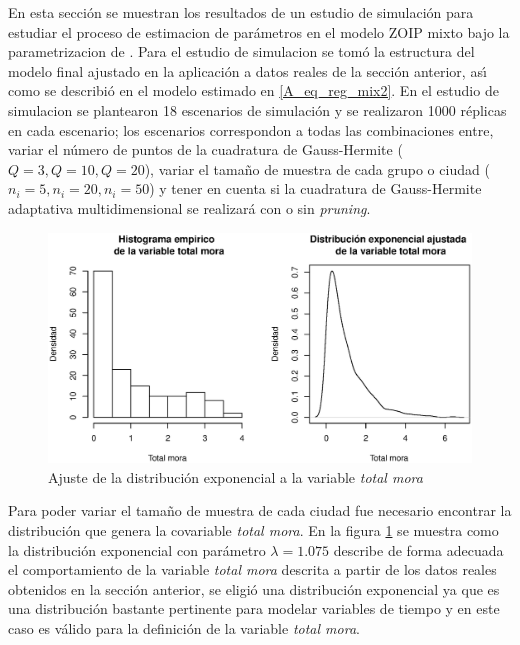 En esta secci\'{o}n se muestran los resultados de un estudio de simulaci\'{o}n para estudiar el proceso de estimacion de par\'{a}metros en el modelo ZOIP mixto bajo la parametrizacion de \cite{Stasinopoulos2}. Para el estudio de simulacion se tom\'{o} la estructura del modelo final ajustado en la aplicaci\'{o}n a datos reales de la secci\'{o}n anterior, as\'{\i} como se describi\'{o} en el modelo estimado en \eqref{A_eq_reg_mix2}. En el estudio de simulacion se plantearon 18 escenarios de simulaci\'{o}n y se realizaron 1000 r\'{e}plicas en cada escenario; los escenarios correspondon a todas las combinaciones entre, variar el n\'{u}mero de puntos de la cuadratura de Gauss-Hermite ($Q=3 , Q=10, Q=20$), variar el tama\~{n}o de muestra de cada grupo o ciudad ($n_i=5, n_i=20, n_i=50$) y tener en cuenta si la cuadratura de Gauss-Hermite adaptativa multidimensional se realizar\'{a} con o sin \textit{pruning}.\\

\begin{figure}
	\begin{center}
		\includegraphics[scale=0.6]{Ajuste_expo_mix.eps}	
		\caption{Ajuste de la distribuci\'{o}n exponencial a la variable \textsl{total mora}}
		\label{Ajuste_expo_mix}
	\end{center}
\end{figure}

Para poder variar el tama\~{n}o de muestra de cada ciudad fue necesario encontrar la distribuci\'{o}n que genera la covariable \textsl{total mora}. En la figura \ref{Ajuste_expo_mix} se muestra como la distribuci\'{o}n exponencial con par\'{a}metro $\lambda=1.075$ describe de forma adecuada el comportamiento de la variable \textsl{total mora} descrita a partir de los datos reales obtenidos en la secci\'{o}n anterior, se eligi\'{o} una distribuci\'{o}n exponencial ya que es una distribuci\'{o}n bastante pertinente para modelar variables de tiempo y en este caso es v\'{a}lido para la definici\'{o}n de la variable \textsl{total mora}.\\

